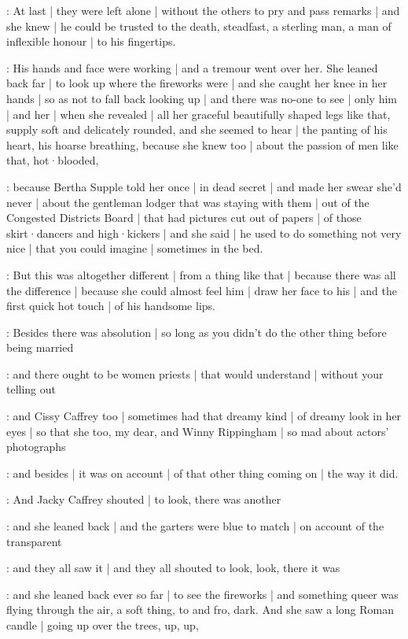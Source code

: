 \gertyNovel:
At last |
they were left alone |
without the others to pry and pass remarks |
and she knew |
he could be trusted to the death,
steadfast,
a sterling man,
a man of inflexible honour |
to his fingertips.

\gertySex:
His hands and face were working |
and a tremour went over her.
She leaned back far |
to look up
where the fireworks were |
and she caught her knee in her hands |
so as not to fall back looking up |
and there was no-one to see |
only him |
and her |
when she revealed |
all her graceful beautifully shaped legs like that,
supply soft and delicately rounded,
and she seemed to hear |
the panting of his heart,
his hoarse breathing,%
because she knew too |
about the passion of men like that,
hot·blooded,

\gertyJudgy:
because Bertha Supple told her once |
in dead secret |
and made her swear she'd never |
about the gentleman lodger that was staying with them |
out of the Congested Districts Board |
that had pictures cut out of papers |
of those skirt·dancers and high·kickers |
and she said |
he used to do something not very nice |
that you could imagine |
sometimes in the bed.

\gertySex:
But this was altogether different |
from a thing like that |
because there was all the difference |
because she could almost feel him |
draw her face to his |
and the first quick hot touch |
of his handsome lips.

\gertyJudgy:
Besides there was absolution |
so long as you didn't do the other thing before being married

\gertyReal:
and there ought to be women priests |%
that would understand |
without your telling out

\gertyNovel:
and Cissy Caffrey too |
sometimes had that dreamy kind |
of dreamy look in her eyes |
so that she too,
my dear,
and Winny Rippingham |
so mad about actors' photographs

\gertyReal:
and besides |
it was on account |
of that other thing coming on |
the way it did.

:
And Jacky Caffrey shouted |
to look,
there was another

\gertySex:
and she leaned back |
and the garters were blue to match |
on account of the transparent

:
and they all saw it |
and they all shouted to look,
look,
there it was

\gertySex:
and she leaned back ever so far |
to see the fireworks |
and something queer was flying through the air,
a soft thing,
to and fro,
dark.
And she saw a long Roman candle |
going up over the trees,%
up,
up,

